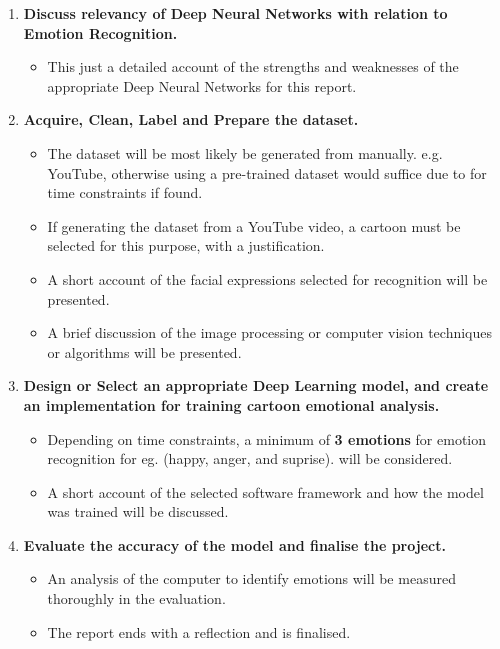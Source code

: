 \documentclass[report, 11pt, oneside]{dissertation}
\begin{document}
\begin{enumerate}
   \item \textbf{Discuss relevancy of Deep Neural Networks with relation to Emotion Recognition.}
   \begin{itemize}
     \item This just a detailed account of the strengths and weaknesses of the appropriate Deep Neural Networks for this report.
   \end{itemize}
   \item \textbf{Acquire, Clean, Label and Prepare the dataset.}
   \begin{itemize}
  	 \item The dataset will be most likely be generated from manually. e.g. YouTube, otherwise using a pre-trained dataset would suffice due to for time constraints if found.
  	 \item If generating the dataset from a YouTube video, a cartoon must be selected for this purpose, with a justification.
  	 \item A short account of the facial expressions selected for recognition will be presented.
  	 \item A brief discussion of the image processing or computer vision techniques or algorithms will be presented.
   \end{itemize}
     \item \textbf{Design or Select an appropriate Deep Learning model, and create an implementation for training cartoon emotional analysis.}
    \begin{itemize}
  	 \item Depending on time constraints, a minimum of \textbf{3 emotions} for emotion recognition for eg. (happy, anger, and suprise). will be considered.
  	 \item A short account of the selected software framework and how the model was trained will be discussed. 
   \end{itemize}
        \item \textbf{Evaluate the accuracy of the model and finalise the project.}
     \begin{itemize}
     	\item An analysis of the computer to identify emotions will be measured thoroughly in the evaluation.
     	\item The report ends with a reflection and is finalised.
   \end{itemize}
\end{enumerate}
\end{document}
